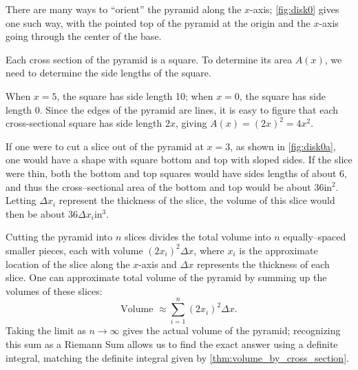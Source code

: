 {There are many ways to ``orient'' the pyramid along the $x$-axis; \autoref{fig:disk0} gives one such way, with the pointed top of the pyramid at the origin and the $x$-axis going through the center of the base.

Each cross section of the pyramid is a square.
To determine its area $A(x)$, we need to determine the side lengths of the square.

When $x=5$, the square has side length 10; when $x=0$, the square has side length 0. Since the edges of the pyramid are lines, it is easy to figure that each cross-sectional square has side length $2x$, giving $A(x) = (2x)^2=4x^2$. %

If one were to cut a slice out of the pyramid at $x=3$, as shown in \autoref{fig:disk0a}, one would have a shape with square bottom and top with sloped sides. If the slice were thin, both the bottom and top squares would have sides lengths of about 6, and thus the cross--sectional area of the bottom and top would be about 36in$^2$. Letting $\Delta x_i$ represent the thickness of the slice, the volume of this slice would then be about $36\Delta x_i$in$^3$. 

Cutting the pyramid into $n$ slices divides the total volume into $n$ equally--spaced smaller pieces, each with volume $(2x_i)^2\Delta x$, where $x_i$ is the approximate location of the slice along the $x$-axis and $\Delta x$ represents the thickness of each slice. One can approximate total volume of the pyramid by summing up the volumes of these slices:
$$\text{Volume } \approx \sum_{i=1}^n (2x_i)^2\Delta x.$$
Taking the limit as $n\to\infty$ gives the actual volume of the pyramid; recognizing this sum as a Riemann Sum allows us to find the exact answer using a definite integral, matching the definite integral given by \autoref{thm:volume_by_cross_section}.

}
